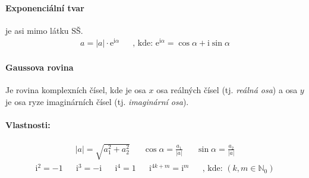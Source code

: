 \documentclass[12pt]{article}
\providecommand{\abs}[1]{\lvert#1\rvert}
\newcommand{\euler}{\mathrm{e}} %
\newcommand{\iu}{\mathrm{i}} %
\begin{document}
\paragraph{Exponenciální tvar} je asi mimo látku SŠ.
\begin{align}
a = \abs{a} \cdot \euler ^{\iu \alpha} && \text{, kde:	} \euler^{\iu \alpha} = \cos \alpha + \iu \sin \alpha
\end{align}
\paragraph{Gaussova rovina}
Je rovina komplexních čísel, kde je osa $x$ osa reálných čísel (tj. \emph{reálná osa}) a osa $y$ je osa ryze imaginárních čísel (tj. \emph{imaginární osa}).
\paragraph{Vlastnosti:}
\begin{align}
\abs{a} = \sqrt{a_1^2 + a_2^2} && \cos \alpha = \frac{a_1}{\abs{a}} && \sin \alpha = \frac{a_2}{\abs{a}}
\end{align}
\begin{align}
\iu^2 = -1 && \iu^3 = -\iu && \iu^4 = 1 && \iu^{4k+m} = \iu^m && \text{, kde:	} (k,m \in \mathbb{N}_0)
\end{align}
\end{document}
